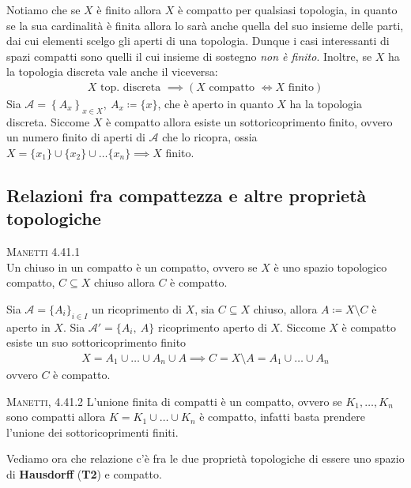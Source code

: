 \begin{observe}
Notiamo che se $X$ è finito allora $X$ è compatto per qualsiasi topologia, in quanto se la sua cardinalità è finita allora lo sarà anche quella del suo insieme delle parti, dai cui elementi scelgo gli aperti di una topologia. Dunque i casi interessanti di spazi compatti sono quelli il cui insieme di sostegno \textit{non è finito}.\newline
Inoltre, se $X$ ha la topologia discreta vale anche il viceversa:
	\begin{gather*}
		X \text{ top. discreta } \implies \left( X \text{ compatto } \iff X \text{ finito}\right)
	\end{gather*}
Sia $\mathcal{A}=\left\{ A_x\right\}_{x\in X}, \ A_x\coloneqq \{x\}$, che è aperto in quanto $X$ ha la topologia discreta. Siccome $X$ è compatto allora esiste un sottoricoprimento finito, ovvero un numero finito di aperti di $\mathcal{A}$ che lo ricopra, ossia $X=\{x_1\}\cup\{x_2\}\cup\dots\{x_n\}\implies X$ finito.
\end{observe}
\subsection{Relazioni fra compattezza e altre proprietà topologiche}
\begin{theorema}\textsc{Manetti 4.41.1} \label{chiuso in compatto}\\
	Un chiuso in un compatto è un compatto, ovvero se $X$ è uno spazio topologico compatto, $C\subseteq X$ chiuso allora $C$ è compatto.
\end{theorema}
\begin{demonstration}
	Sia $\mathcal{A}=\{A_i \}_{i\in I}$ un ricoprimento di $X$, sia $C\subseteq X$ chiuso, allora $A\coloneqq X\setminus C$ è aperto in $X$.\newline
	Sia $\mathcal{A}'=\{A_i,\ A\}$ ricoprimento aperto di $X$. Siccome $X$ è compatto esiste un suo sottoricoprimento finito 
		\begin{gather*}
			X=A_1\cup\dots\cup A_n\cup A \implies C=X\setminus A=A_1\cup\dots\cup A_n
		\end{gather*}
	ovvero $C$ è compatto.
\end{demonstration}

\begin{observe}\textsc{Manetti, 4.41.2}
	L'unione finita di compatti è un compatto, ovvero se $K_1,\dots,K_n$ sono compatti allora $K=K_1\cup\dots\cup K_n$ è compatto, infatti basta prendere l'unione dei sottoricoprimenti finiti.
\end{observe}
Vediamo ora che relazione c'è fra le due proprietà topologiche di essere uno spazio di \textbf{Hausdorff} (\textbf{T2}) e compatto.

